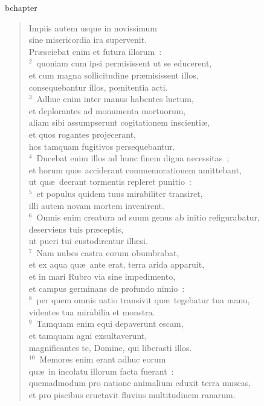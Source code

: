 bchapter\begin{verse}\vspace{-19pt}Impiis autem usque in novissimum\\ sine misericordia ira supervenit.\\ Pr\ae sciebat enim et futura illorum~:\\
${}^{2}$~quoniam cum ipsi permisissent ut se educerent,\\ et cum magna sollicitudine pr\ae misissent illos,\\ consequebantur illos, pœnitentia acti.\\
${}^{3}$~Adhuc enim inter manus habentes luctum,\\ et deplorantes ad monumenta mortuorum,\\ aliam sibi assumpserunt cogitationem inscienti\ae ,\\ et quos rogantes projecerant,\\ hos tamquam fugitivos persequebantur.\\
${}^{4}$~Ducebat enim illos ad hunc finem digna necessitas~;\\ et horum qu\ae\ acciderant commemorationem amittebant,\\ ut qu\ae\ deerant tormentis repleret punitio~:\\
${}^{5}$~et populus quidem tuus mirabiliter transiret,\\ illi autem novam mortem invenirent.\\
${}^{6}$~Omnis enim creatura ad suum genus ab initio refigurabatur,\\ deserviens tuis pr\ae ceptis,\\ ut pueri tui custodirentur ill\ae si.\\
${}^{7}$~Nam nubes castra eorum obumbrabat,\\ et ex aqua qu\ae\ ante erat, terra arida apparuit,\\ et in mari Rubro via sine impedimento,\\ et campus germinans de profundo nimio~:\\
${}^{8}$~per quem omnis natio transivit qu\ae\ tegebatur tua manu,\\ videntes tua mirabilia et monstra.\\
${}^{9}$~Tamquam enim equi depaverunt escam,\\ et tamquam agni exsultaverunt,\\ magnificantes te, Domine, qui liberasti illos.\\
${}^{10}$~Memores enim erant adhuc eorum\\ qu\ae\ in incolatu illorum facta fuerant~:\\ quemadmodum pro natione animalium eduxit terra muscas,\\ et pro piscibus eructavit fluvius multitudinem ranarum.\\

\end{verse}
